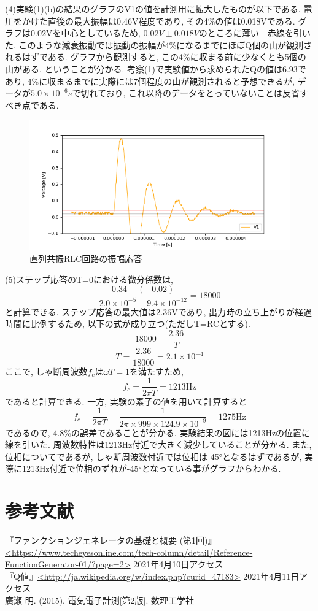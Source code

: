 \documentclass[a4j,dvipdfmx]{article}
\begin{document}
(4)実験(1)(b)の結果のグラフのV1の値を計測用に拡大したものが以下である. 電圧をかけた直後の最大振幅は0.46V程度であり, その4\%の値は0.018Vである. グラフは0.02Vを中心としているため, $0.02V\pm 0.018V$のところに薄い　赤線を引いた. このような減衰振動では振動の振幅が4\%になるまでにほぼQ個の山が観測されるはずである. グラフから観測すると, この4\%に収まる前に少なくとも5個の山がある, ということが分かる. 考察(1)で実験値から求められたQの値は6.93であり, 4\%に収まるまでに実際には7個程度の山が観測されると予想できるが, データが$5.0\times 10^{-6}s$で切れており, これ以降のデータをとっていないことは反省すべき点である. 

\begin{figure}[H]
    \begin{center}
     	\includegraphics[width=12cm]{figures/1b(blownup).png}
        \caption{直列共振RLC回路の振幅応答}
    \end{center}
\end{figure}

(5)ステップ応答のT=0における微分係数は, 
$$
\frac{0.34 - (-0.02)}{2.0\times10^{-5} - 9.4\times10^{-12}} = 18000
$$
と計算できる. ステップ応答の最大値は2.36Vであり, 出力時の立ち上がりが経過時間に比例するため, 以下の式が成り立つ(ただしT=RCとする). 
$$
18000 = \frac{2.36}{T}
$$
$$
T = \frac {2.36}{18000} = 2.1 \times 10^{-4}
$$
ここで, しゃ断周波数$f_c$は$\omega T = 1$を満たすため, 
$$
f_c = \frac{1}{2\pi T} = 1213\mbox{Hz}
$$
であると計算できる. 一方, 実験の素子の値を用いて計算すると
$$
f_c = \frac{1}{2\pi T} = \frac{1}{2\pi \times 999 \times 124.9 \times 10^{-9}} = 1275 \mbox{Hz}
$$
であるので, 4.8\%の誤差であることが分かる. 実験結果の図には1213Hzの位置に線を引いた. 周波数特性は1213Hz付近で大きく減少していることが分かる. また, 位相についてであるが, しゃ断周波数付近では位相は\ang{-45}となるはずであるが, 実際に1213Hz付近で位相のずれが\ang{-45}となっている事がグラフからわかる. 

\section{参考文献} 
『ファンクションジェネレータの基礎と概要 (第1回)』\url{<https://www.techeyesonline.com/tech-column/detail/Reference-FunctionGenerator-01/?page=2>} 2021年4月10日アクセス\\

『Q値』\url{<http://ja.wikipedia.org/w/index.php?curid=47183>} 2021年4月11日アクセス\\

廣瀬 明. (2015). 電気電子計測[第2版]. 数理工学社
\end{document}
